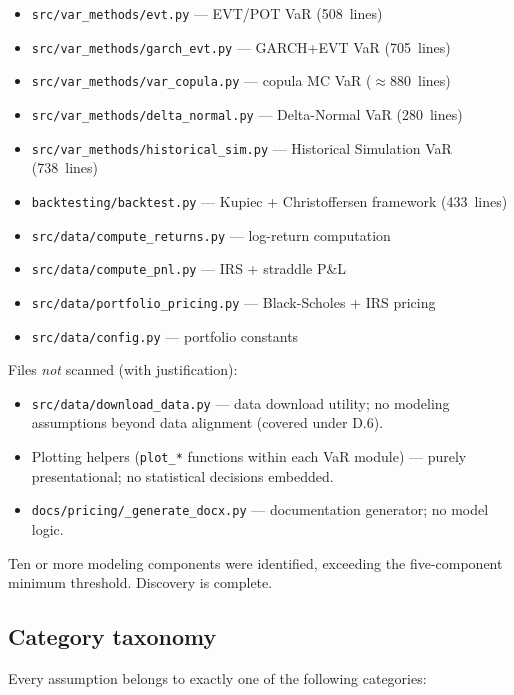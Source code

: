 \documentclass[11pt,a4paper]{article}
\newcommand{\code}[1]{\texttt{#1}}
\begin{document}
\begin{itemize}
  \item \code{src/var\_methods/evt.py} --- EVT/POT VaR (508~lines)
  \item \code{src/var\_methods/garch\_evt.py} --- GARCH+EVT VaR (705~lines)
  \item \code{src/var\_methods/var\_copula.py} --- copula MC VaR ($\approx$880~lines)
  \item \code{src/var\_methods/delta\_normal.py} --- Delta-Normal VaR (280~lines)
  \item \code{src/var\_methods/historical\_sim.py} --- Historical Simulation VaR (738~lines)
  \item \code{backtesting/backtest.py} --- Kupiec + Christoffersen framework (433~lines)
  \item \code{src/data/compute\_returns.py} --- log-return computation
  \item \code{src/data/compute\_pnl.py} --- IRS + straddle P\&L
  \item \code{src/data/portfolio\_pricing.py} --- Black-Scholes + IRS pricing
  \item \code{src/data/config.py} --- portfolio constants
\end{itemize}

Files \emph{not} scanned (with justification):
\begin{itemize}
  \item \code{src/data/download\_data.py} --- data download utility; no
    modeling assumptions beyond data alignment (covered under D.6).
  \item Plotting helpers (\code{plot\_*} functions within each VaR module) ---
    purely presentational; no statistical decisions embedded.
  \item \code{docs/pricing/\_generate\_docx.py} --- documentation generator; no model logic.
\end{itemize}

\noindent Ten or more modeling components were identified, exceeding the
five-component minimum threshold. Discovery is complete.

\subsection{Category taxonomy}\label{sec:taxonomy}

Every assumption belongs to exactly one of the following categories:
\end{document}
